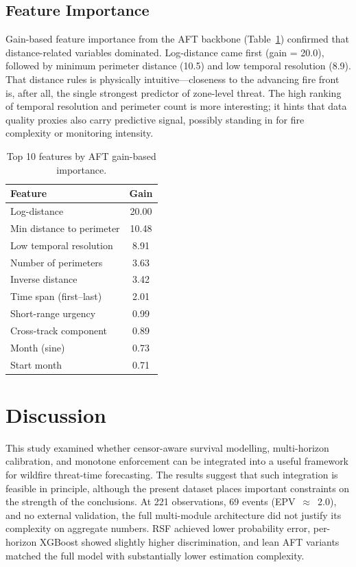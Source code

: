 \documentclass[fire,article,submit,pdftex]{../Definitions/mdpi}
\begin{document}
\subsection{Feature Importance}\label{sec:feature_importance}

Gain-based feature importance from the AFT backbone (Table~\ref{tab:feature_importance}) confirmed that distance-related variables dominated. Log-distance came first (gain = 20.0), followed by minimum perimeter distance (10.5) and low temporal resolution (8.9).
That distance rules is physically intuitive---closeness to the advancing fire front is, after all, the single strongest predictor of zone-level threat.
The high ranking of temporal resolution and perimeter count is more interesting; it hints that data quality proxies also carry predictive signal, possibly standing in for fire complexity or monitoring intensity.

\begin{table}[!ht]
\caption{Top 10 features by AFT gain-based importance.}\label{tab:feature_importance}
\begin{tabular}{lc}
\toprule
\textbf{Feature} & \textbf{Gain} \\
\midrule
Log-distance              & 20.00 \\
Min distance to perimeter & 10.48 \\
Low temporal resolution   &  8.91 \\
Number of perimeters      &  3.63 \\
Inverse distance          &  3.42 \\
Time span (first--last)   &  2.01 \\
Short-range urgency       &  0.99 \\
Cross-track component     &  0.89 \\
Month (sine)              &  0.73 \\
Start month               &  0.71 \\
\bottomrule
\end{tabular}
\end{table}

\section{Discussion}\label{sec:discussion}

This study examined whether censor-aware survival modelling, multi-horizon calibration, and monotone enforcement can be integrated into a useful framework for wildfire threat-time forecasting. The results suggest that such integration is feasible in principle, although the present dataset places important constraints on the strength of the conclusions. At 221 observations, 69 events (EPV~$\approx$~2.0), and no external validation, the full multi-module architecture did not justify its complexity on aggregate numbers. RSF achieved lower probability error, per-horizon XGBoost showed slightly higher discrimination, and lean AFT variants matched the full model with substantially lower estimation complexity.
\end{document}
